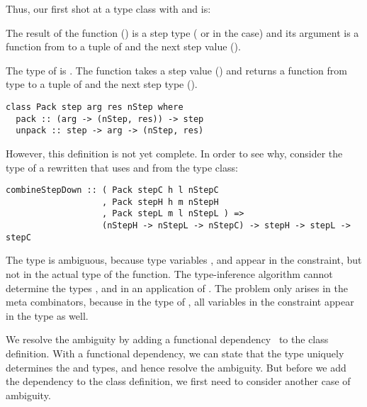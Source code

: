 Thus, our first shot at a type class with  and  is:

\bc The result of the function () is a step type ( or  in the  case) and its argument is a function from  to a tuple of  and the next step value ().  


 The type of  is . The function takes a step value () and returns a function from type  to a tuple of  and the next step type (). 
\ec


\begin{small}
\begin{verbatim}
class Pack step arg res nStep where
  pack :: (arg -> (nStep, res)) -> step
  unpack :: step -> arg -> (nStep, res)
\end{verbatim}
\end{small}

However, this definition is not yet complete. In order to see why, consider the type of a rewritten  that uses  and  from the type class:

\begin{small}
\begin{verbatim}
combineStepDown :: ( Pack stepC h l nStepC 
                   , Pack stepH h m nStepH
                   , Pack stepL m l nStepL ) => 
                   (nStepH -> nStepL -> nStepC) -> stepH -> stepL -> stepC
\end{verbatim}
\end{small}

The type is ambiguous, because type variables ,  and  appear in the constraint, but not in the actual type of the function. The type-inference algorithm cannot determine the types ,  and  in an application of . The problem only arises in the  meta combinators, because in the type of , all variables in the constraint appear in the type as well.

We resolve the ambiguity by adding a functional dependency~\cite{jones00fundep} to the class definition. With a functional dependency, we can state  that  the  type uniquely determines the  and  types, and hence resolve the ambiguity. But before we add the dependency to the class definition, we first need to consider another case of ambiguity.

